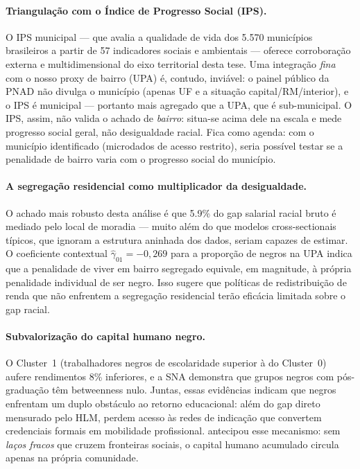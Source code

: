 \documentclass[12pt, a4paper, oneside]{article}
\begin{document}
\paragraph{Triangulação com o Índice de Progresso Social (IPS).}
O IPS municipal \cite{wilm2026} --- que avalia a qualidade de vida dos
5.570 municípios brasileiros a partir de 57 indicadores sociais e ambientais ---
oferece corroboração externa e multidimensional do eixo territorial desta tese.
Uma integração \textit{fina} com o nosso proxy de bairro (UPA) é, contudo,
inviável: o painel público da PNAD não divulga o município (apenas UF e a situação
capital/RM/interior), e o IPS é municipal --- portanto mais agregado que a UPA, que
é sub-municipal. O IPS, assim, não valida o achado de \emph{bairro}: situa-se
acima dele na escala e mede progresso social geral, não desigualdade racial. Fica
como agenda: com o município identificado (microdados de acesso restrito), seria
possível testar se a penalidade de bairro varia com o progresso social do município.

\paragraph{A segregação residencial como multiplicador da desigualdade.}
O achado mais robusto desta análise é que 5.9\% do gap salarial racial
bruto é mediado pelo local de moradia --- muito além do que modelos
cross-sectionais típicos, que ignoram a estrutura aninhada dos dados,
seriam capazes de estimar. O coeficiente contextual
$\hat{\gamma}_{01} = -0{,}269$ para a proporção de negros na UPA
indica que a penalidade de viver em bairro segregado equivale,
em magnitude, à própria penalidade individual de ser negro.
Isso sugere que políticas de redistribuição de renda que não enfrentem
a segregação residencial terão eficácia limitada sobre o gap racial.

\paragraph{Subvalorização do capital humano negro.}
O Cluster~1 (trabalhadores negros de escolaridade superior à do Cluster~0)
aufere rendimentos 8\% inferiores, e a SNA demonstra que grupos negros com
pós-graduação têm betweenness nulo. Juntas, essas evidências indicam que
negros enfrentam um duplo obstáculo ao retorno educacional: além do
gap direto mensurado pelo HLM, perdem acesso às redes de indicação
que convertem credenciais formais em mobilidade profissional.
 antecipou esse mecanismo: sem \textit{laços fracos}
que cruzem fronteiras sociais, o capital humano acumulado circula
apenas na própria comunidade.
\end{document}
